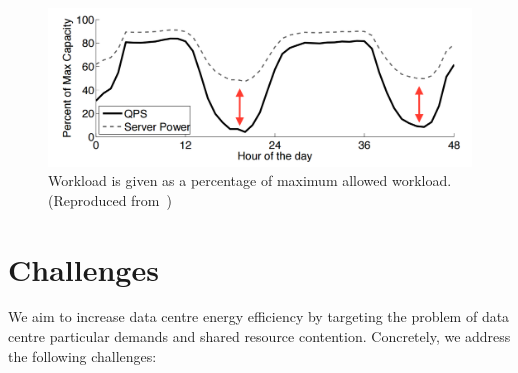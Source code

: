 \begin{figure}[t] 
    \centering 
    \includegraphics[width=\textwidth]{Chapter0/Figs/octoman.png} 
    \caption[Typical server load and power consumption in Google data centres]{ Workload is given as a percentage 
    of maximum allowed workload.  (Reproduced from~\citep{Meisner2011PowerServices,Bilgir_exploringthe})}
    \label{fig: google load1} 
\end{figure} 


\section{Challenges}%

\label{sec: challenges}

We aim to increase data centre energy efficiency by targeting the problem of data centre
particular demands and shared resource contention.  Concretely, we address the following
challenges:


